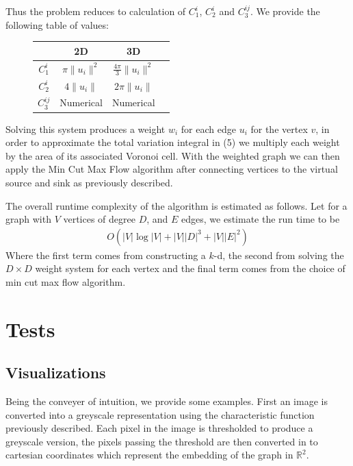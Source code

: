 \documentclass[12pt]{article}
\begin{document}
Thus the problem reduces to calculation of $C_1^i$, $C_2^i$ and $C_3^{ij}$. We provide the following table of values:

\begin{figure}[H]
\centering
\begin{tabular}{|c|c|c|c|}
\hline
 &  2D  & 3D  \\
\hline
 $C_1^i$ & $\pi \| u_i \|^2$  & $\frac{4\pi}{3}\|u_i\|^2$   \\
\hline
 $C_2^i$ & $4\| u_i \|$  & $2\pi \|u_i\|$    \\
\hline
 $C_3^{ij}$ & Numerical  & Numerical    \\
\hline
\end{tabular}
\end{figure}

Solving this system produces a weight $w_i$ for each edge $u_i$ for the vertex $v$, in order to approximate the total variation integral in (5) we multiply each weight by the area of its associated Voronoi cell. With the weighted graph we can then apply the Min Cut Max Flow algorithm after connecting vertices to the virtual source and sink as previously described.

The overall runtime complexity of the algorithm is estimated as follows. Let for a graph with $V$ vertices of degree $D$, and $E$ edges, we estimate the run time to be
\begin{align}
	O(|V|\log|V| + |V||D|^3 + |V||E|^2)
\end{align}
Where the first term comes from constructing a $k$-d, the second from solving the $D \times D$ weight system for each vertex and the final term comes from the choice of min cut max flow algorithm.  


\section{Tests}

\subsection{Visualizations}

Being the conveyer of intuition, we provide some examples. First an image is converted into a greyscale representation using the characteristic function previously described. Each pixel in the image is thresholded to produce a greyscale version, the pixels passing the threshold are then converted in to cartesian coordinates which represent the embedding of the graph in $\mathbb{R}^2$. 
\end{document}
